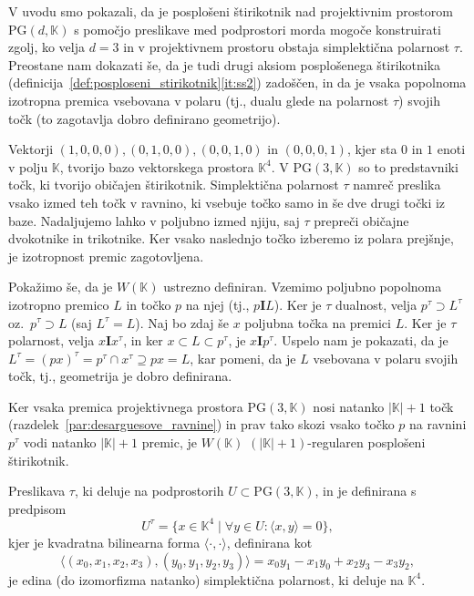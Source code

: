 \documentclass[fin1, tisk]{fmfdelo}
\newcommand{\II}{\mathbf{I}}
\newcommand{\PG}{\mathrm{PG}}
\begin{document}
\begin{dokaz}
    V uvodu smo pokazali, da je posplošeni štirikotnik nad projektivnim prostorom $\PG(d, \mathbb{K})$ s pomočjo 
    preslikave med podprostori morda mogoče konstruirati zgolj, ko velja $d = 3$ in v projektivnem prostoru obstaja simplektična polarnost $\tau$. Preostane nam dokazati še, da je tudi drugi
    aksiom posplošenega štirikotnika (definicija~\ref{def:posploseni_stirikotnik}\ref{it:ss2}) zadoščen, in da je vsaka popolnoma izotropna premica
    vsebovana v polaru (tj., dualu glede na polarnost $\tau$) svojih točk (to zagotavlja dobro definirano geometrijo).

    Vektorji $(1,0,0,0), (0,1,0,0),(0,0,1,0)$ in $(0,0,0,1)$, kjer sta $0$ in $1$ enoti v polju $\mathbb{K}$, tvorijo bazo
    vektorskega prostora $\mathbb{K}^4$. V $\PG(3, \mathbb{K})$ so to predstavniki točk, ki
    tvorijo običajen štirikotnik. Simplektična polarnost $\tau$ namreč preslika vsako izmed teh točk v ravnino, ki vsebuje 
    točko samo in še dve drugi točki iz baze. Nadaljujemo lahko v poljubno izmed njiju, saj $\tau$ prepreči običajne dvokotnike in trikotnike.
    Ker vsako naslednjo točko izberemo iz polara prejšnje, je izotropnost premic zagotovljena.

    Pokažimo še, da je $W(\mathbb{K})$ ustrezno definiran. Vzemimo poljubno popolnoma izotropno premico $L$ in točko $p$ na njej (tj., $p\II L$).
    Ker je $\tau$ dualnost, velja $p^\tau \supset L^\tau$ oz.~$p^\tau \supset L$ (saj $L^\tau = L$). Naj bo zdaj še $x$ poljubna točka 
    na premici $L$. Ker je $\tau$ polarnost, velja $x\II x^\tau$, 
    in ker $x\subset L\subset p^\tau$, je $x \II p^\tau$.
    Uspelo nam je pokazati, da je $L^\tau = (px)^\tau = p^\tau \cap x^\tau \supseteq px =  L$, kar pomeni, da je $L$ vsebovana 
    v polaru svojih točk, tj., geometrija je dobro definirana.

    Ker vsaka premica projektivnega prostora $\PG(3, \mathbb{K})$ nosi 
    natanko $|\mathbb{K}| + 1$ točk (razdelek~\ref{par:desarguesove_ravnine}) in prav tako
    skozi vsako točko $p$ na ravnini $p^\tau$ vodi natanko
    $|\mathbb{K}| + 1$ premic, je $W(\mathbb{K})$ $(|\mathbb{K}| + 1)$-regularen posplošeni štirikotnik.
\end{dokaz}

\begin{trditev}\label{tr:edina_simplekticna_polarnost}
    Preslikava $\tau$, ki deluje na podprostorih $U\subset \PG(3, \mathbb{K})$, in je definirana s predpisom
    \[U^\tau = \{x\in \mathbb{K}^4\mid \forall y\in U: \langle x, y\rangle = 0\},\]
    kjer je kvadratna bilinearna forma $\langle \cdot, \cdot\rangle$, definirana kot
    \[ \langle (x_0, x_1, x_2, x_3), (y_0, y_1, y_2, y_3) \rangle = x_0 y_1 - x_1 y_0 + x_2 y_3 - x_3 y_2,\]
    je edina (do izomorfizma natanko) simplektična polarnost, ki deluje na $\mathbb{K}^4$.
\end{trditev}
\end{document}
